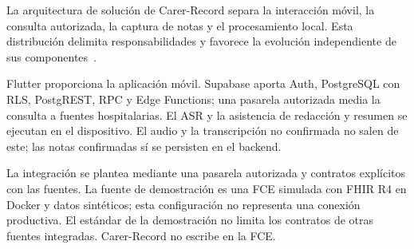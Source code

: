 La arquitectura de solución de Carer-Record separa la interacción móvil, la consulta autorizada, la captura de notas y el procesamiento local. Esta distribución delimita responsabilidades y favorece la evolución independiente de sus componentes~\cite{arch_patterns_health}.

Flutter proporciona la aplicación móvil. Supabase aporta Auth, PostgreSQL con RLS, PostgREST, RPC y Edge Functions; una pasarela autorizada media la consulta a fuentes hospitalarias. El ASR y la asistencia de redacción y resumen se ejecutan en el dispositivo. El audio y la transcripción no confirmada no salen de este; las notas confirmadas sí se persisten en el backend.

La integración se plantea mediante una pasarela autorizada y contratos explícitos con las fuentes. La fuente de demostración es una FCE simulada con FHIR R4 en Docker y datos sintéticos; esta configuración no representa una conexión productiva. El estándar de la demostración no limita los contratos de otras fuentes integradas. Carer-Record no escribe en la FCE.
